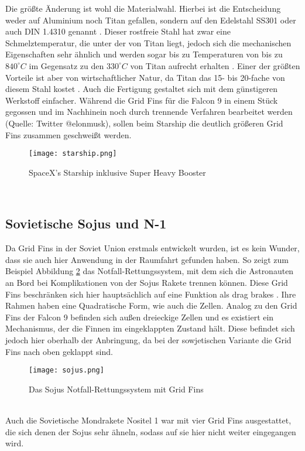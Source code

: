 Die größte Änderung ist wohl die Materialwahl. Hierbei ist die Entscheidung weder auf Aluminium noch Titan gefallen, sondern auf den Edelstahl SS301 oder auch DIN 1.4310 genannt \cite{titanium}. Dieser rostfreie Stahl hat zwar eine Schmelztemperatur, die unter der von Titan liegt, jedoch sich die mechanischen Eigenschaften sehr ähnlich und werden sogar bis zu Temperaturen von bis zu $840^\circ C$ im Gegensatz zu den $330^\circ C$ von Titan aufrecht erhalten \cite{titanium}. Einer der größten Vorteile ist aber von wirtschaftlicher Natur, da Titan das 15- bis 20-fache von diesem Stahl kostet \cite{titanium}. Auch die Fertigung gestaltet sich mit dem günstigeren Werkstoff einfacher. Während die Grid Fins für die Falcon 9 in einem Stück gegossen und im Nachhinein noch durch trennende Verfahren bearbeitet werden (Quelle: Twitter @elonmusk), sollen beim Starship die deutlich größeren Grid Fins zusammen geschweißt werden.
\begin{figure}[h]
	\centering
	\texttt{[image: starship.png]}
	\begin{flushright}
	\end{flushright}
	\caption{SpaceX's Starship inklusive Super Heavy Booster}
	\label{abb_starship}
\end{figure}\\
\subsection{Sovietische Sojus und N-1}
Da Grid Fins in der Soviet Union erstmals entwickelt wurden, ist es kein Wunder, dass sie auch hier Anwendung in der Raumfahrt gefunden haben. So zeigt zum Beispiel Abbildung \ref{abb_sojus} das Notfall-Rettungssystem, mit dem sich die Astronauten an Bord bei Komplikationen von der Sojus Rakete trennen können. Diese Grid Fins beschränken sich hier hauptsächlich auf eine Funktion als drag brakes \cite{soyuz}. Ihre Rahmen haben eine Quadratische Form, wie auch die Zellen. Analog zu den Grid Fins der Falcon 9 befinden sich außen dreieckige Zellen und es existiert ein Mechanismus, der die Finnen im eingeklappten Zustand hält. Diese befindet sich jedoch hier oberhalb der Anbringung, da bei der sowjetischen Variante die Grid Fins nach oben geklappt sind.
\begin{figure}[h]
	\centering
	\texttt{[image: sojus.png]}
	\caption{Das Sojus Notfall-Rettungssystem mit Grid Fins}
	\label{abb_sojus}
\end{figure}\\
Auch die Sovietische Mondrakete Nositel 1 war mit vier Grid Fins ausgestattet, die sich denen der Sojus sehr ähneln, sodass auf sie hier nicht weiter eingegangen wird.

